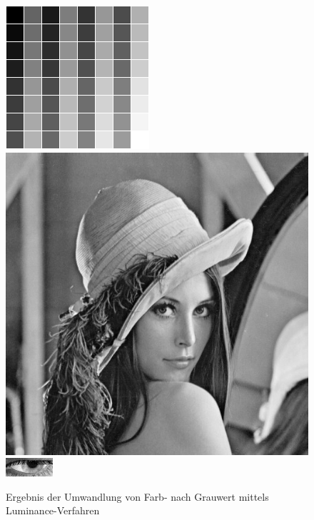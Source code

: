 \begin{figure}
	\centering
	\includegraphics[width=0.2\linewidth]{img/Farbkarte_Normal}
	\includegraphics[width=0.2\linewidth]{img/Lena_Normal}
	\includegraphics[width=0.2\linewidth]{img/Auge_NormGray}
	\caption{Ergebnis der Umwandlung von Farb- nach Grauwert mittels Luminance-Verfahren}
	\label{img_Luminance}
\end{figure}

